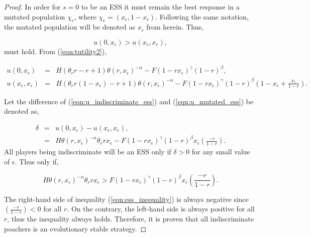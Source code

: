 \documentclass[10pt]{article}
\begin{document}
\begin{proof}
    In order for \(s=0\) to be an ESS it must
    remain the best response in a mutated population \(\chi_\epsilon\),
    where \(\chi_{\epsilon}=(x_\epsilon, 1 - x_\epsilon)\). Following the same
    notation, the mutated population will be denoted as \(x_\epsilon\) from
    herein. Thus,

    \begin{equation}\label{eqn:evolutionary_stability}
        u(0, x_\epsilon) > u(x_\epsilon, x_\epsilon),
    \end{equation}
    must hold. From (\ref{eqn:tutility2}),

    \begin{eqnarray}
        \label{eqn:u_indiscriminate_ess}
        u(0, x_\epsilon)  &=& H(\theta_rr - r + 1)\theta(r, x_\epsilon) ^{-\alpha}
        - F(1 - rx_\epsilon) ^ {\gamma} (1- r) ^ {\beta},
        \\
        \label{eqn:u_mutated_ess}
         u(x_\epsilon, x_\epsilon) &=& H(\theta_rr(1 - x_\epsilon)-r+ 1)\theta(r,
        x_\epsilon) ^{-\alpha} - F(1 - rx_\epsilon) ^ {\gamma} (1- r) ^
        {\beta}\left(1 -
        x_\epsilon + \frac{x_\epsilon}{1- r}\right).
\end{eqnarray}

    \noindent Let the difference of (\ref{eqn:u_indiscriminate_ess}) and (\ref{eqn:u_mutated_ess})
    be denoted as,

    \begin{eqnarray}
        \label{eqn:delta}
        \delta &=& u(0, x_\epsilon) - u(x_\epsilon, x_\epsilon),
          \\
         &=& H\theta(r,  x_\epsilon) ^{-\alpha} \theta_r r x_\epsilon -
        F(1 - r x_\epsilon) ^ {\gamma} (1- r) ^
        {\beta}x_\epsilon\left(\frac{-r}{1- r}\right).
    \end{eqnarray}
    All players being indiscriminate will be an ESS only if \(\delta >0 \) for any small
    value of \(\epsilon\). Thus only if,

    \begin{equation}
    \label{eqn:ess_inequality}
        H\theta(r, x_\epsilon) ^{-\alpha} \theta_r r x_\epsilon > F
        (1 - r x_\epsilon) ^ {\gamma} (1- r) ^ {\beta}
        x_\epsilon\left(\frac{-r}{1- r}\right).
    \end{equation}

    \noindent The right-hand side of inequality (\ref{eqn:ess_inequality}) is always negative
    since \((\frac{-r}{1- r}) < 0\)  for all \(r\). On the contrary, the left-hand
    side is always positive for all \(r\), thus the inequality always holds.
    Therefore, it is proven that all indiscriminate poachers is an evolutionary
    stable strategy.
\end{proof}
\end{document}
